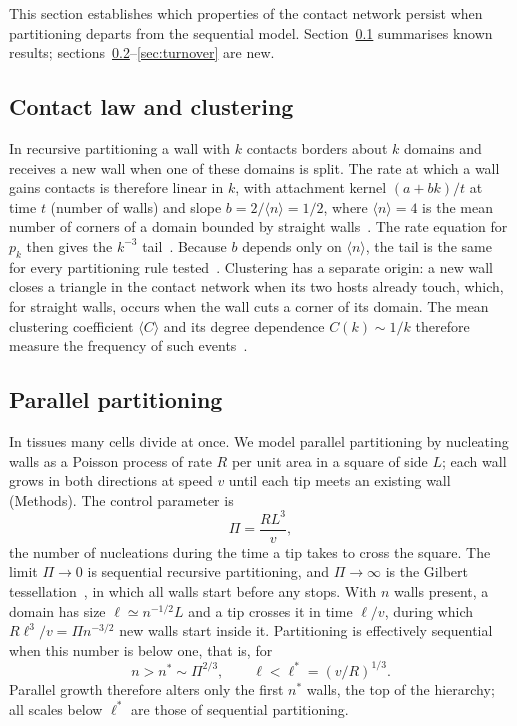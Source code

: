 \documentclass[11pt,a4paper]{article}
\begin{document}
This section establishes which properties of the contact network persist when partitioning
departs from the sequential model. Section~\ref{sec:law} summarises known results;
sections~\ref{sec:parallel}--\ref{sec:turnover} are new.

\subsection{Contact law and clustering}
\label{sec:law}

In recursive partitioning a wall with $k$ contacts borders about $k$ domains and receives a
new wall when one of these domains is split. The rate at which a wall gains contacts is
therefore linear in $k$, with attachment kernel $(a+bk)/t$ at time $t$ (number of walls) and
slope $b=2/\langle n\rangle=1/2$, where $\langle n\rangle=4$ is the mean number of corners of
a domain bounded by straight walls~\cite{vazquez2026sr}. The rate equation for
$p_k$ then gives the $k^{-3}$ tail~\cite{krapivsky2000}. Because $b$ depends only on
$\langle n\rangle$, the tail is the same for every partitioning rule
tested~\cite{vazquez2026div}. Clustering has a separate origin: a new wall closes a triangle in
the contact network when its two hosts already touch, which, for straight walls, occurs when
the wall cuts a corner of its domain. The mean clustering coefficient $\langle C\rangle$ and
its degree dependence $C(k)\sim1/k$ therefore measure the frequency of such
events~\cite{vazquez2026sr}.

\subsection{Parallel partitioning}
\label{sec:parallel}

In tissues many cells divide at once. We model parallel partitioning by nucleating walls as a
Poisson process of rate $R$ per unit area in a square of side $L$; each wall grows in both
directions at speed $v$ until each tip meets an existing wall (Methods). The control parameter
is
\begin{equation}
\Pi=\frac{RL^3}{v},
\end{equation}
the number of nucleations during the time a tip takes to cross the square. The limit $\Pi\to0$
is sequential recursive partitioning, and $\Pi\to\infty$ is the Gilbert
tessellation~\cite{gilbert1967}, in which all walls start before any stops. With $n$ walls
present, a domain has size $\ell\simeq n^{-1/2}L$ and a tip crosses it in time $\ell/v$, during
which $R\ell^3/v=\Pi n^{-3/2}$ new walls start inside it. Partitioning is effectively
sequential when this number is below one, that is, for
\begin{equation}
n>n^*\sim\Pi^{2/3},\qquad \ell<\ell^*=(v/R)^{1/3}.
\end{equation}
Parallel growth therefore alters only the first $n^*$ walls, the top of the hierarchy; all
scales below $\ell^*$ are those of sequential partitioning.
\end{document}
